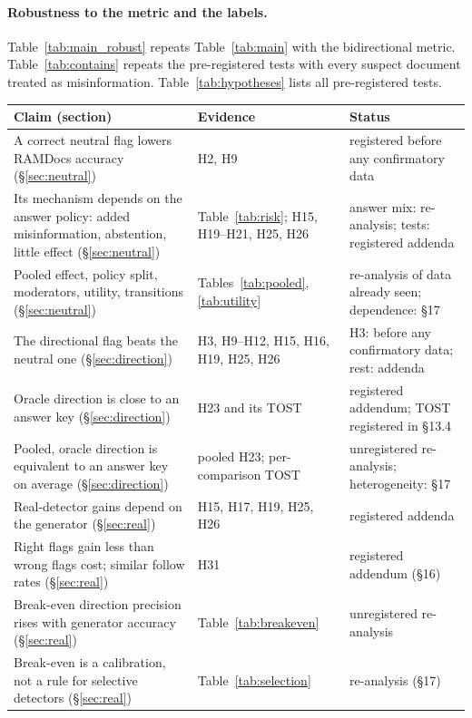 \paragraph{Robustness to the metric and the labels.}
Table~\ref{tab:main_robust} repeats Table~\ref{tab:main} with the bidirectional metric. Table~\ref{tab:contains}
repeats the pre-registered tests with every suspect document treated as misinformation. Table~\ref{tab:hypotheses}
lists all pre-registered tests.

\begin{table}[t]
\centering\footnotesize
\setlength{\tabcolsep}{4pt}
\begin{tabular}{p{7.4cm}p{3.6cm}p{4.2cm}}
\toprule
Claim (section) & Evidence & Status \\
\midrule
A correct neutral flag lowers RAMDocs accuracy (\S\ref{sec:neutral}) & H2, H9 & registered before any confirmatory data \\
Its mechanism depends on the answer policy: added misinformation, abstention, little effect (\S\ref{sec:neutral}) & Table~\ref{tab:risk}; H15, H19--H21, H25, H26 & answer mix: re-analysis; tests: registered addenda \\
Pooled effect, policy split, moderators, utility, transitions (\S\ref{sec:neutral}) & Tables~\ref{tab:pooled}, \ref{tab:utility} & re-analysis of data already seen; dependence: \S17 \\
The directional flag beats the neutral one (\S\ref{sec:direction}) & H3, H9--H12, H15, H16, H19, H25, H26 & H3: before any confirmatory data; rest: addenda \\
Oracle direction is close to an answer key (\S\ref{sec:direction}) & H23 and its TOST & registered addendum; TOST registered in \S13.4 \\
Pooled, oracle direction is equivalent to an answer key on average (\S\ref{sec:direction}) & pooled H23; per-comparison TOST & unregistered re-analysis; heterogeneity: \S17 \\
Real-detector gains depend on the generator (\S\ref{sec:real}) & H15, H17, H19, H25, H26 & registered addenda \\
Right flags gain less than wrong flags cost; similar follow rates (\S\ref{sec:real}) & H31 & registered addendum (\S16) \\
Break-even direction precision rises with generator accuracy (\S\ref{sec:real}) & Table~\ref{tab:breakeven} & unregistered re-analysis \\
Break-even is a calibration, not a rule for selective detectors (\S\ref{sec:real}) & Table~\ref{tab:selection} & re-analysis (\S17) \\

\end{tabular}
\end{table}
